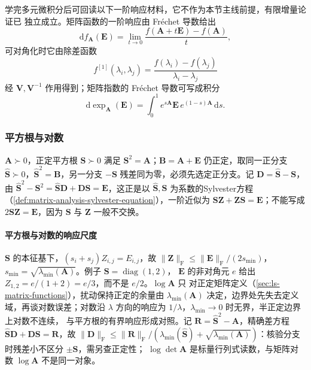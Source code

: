 学完多元微积分后可回读以下一阶响应材料，它不作为本节主线前提，有限增量论证已
独立成立。矩阵函数的一阶响应由 Fréchet 导数给出
\begin{equation}
 \mathrm d f_{\bm A}(\bm E)
 =\lim_{t\to0}\frac{f(\bm A+t\bm E)-f(\bm A)}{t},
 \label{eq:matrix-analysis-frechet-derivative}
\end{equation}
可对角化时它由除差函数
\begin{equation}
 f^{[1]}(\lambda_i,\lambda_j)
 =\frac{f(\lambda_i)-f(\lambda_j)}{\lambda_i-\lambda_j}
 \label{eq:matrix-analysis-frechet-divided-difference}
\end{equation}
经 $\bm V,\bm V^{-1}$ 作用得到；矩阵指数的 Fréchet 导数可写成积分
\begin{equation}
 \mathrm d\exp_{\bm A}(\bm E)
 =\int_0^1 e^{s\bm A}\bm E\,e^{(1-s)\bm A}\,\mathrm ds.
 \label{eq:matrix-analysis-exponential-frechet-derivative}
\end{equation}

\subsubsection{平方根与对数}
\label{sec:ls-square-root-log-sensitivity}

$\bm A\succ0$，正定平方根 $\bm S\succ0$ 满足 $\bm S^2=\bm A$；$\bm B=\bm A+\bm E$
仍正定，取同一正分支 $\widehat{\bm S}\succ0$，$\widehat{\bm S}^2=\bm B$，另一分支
$-\bm S$ 残差同为零，必须先选定正分支。记 $\bm D=\widehat{\bm S}-\bm S$，由
$\widehat{\bm S}^2-\bm S^2=\widehat{\bm S}\bm D+\bm D\bm S=\bm E$，这正是以
$\widehat{\bm S},\bm S$ 为系数的Sylvester方程
（\ref{def:matrix-analysis-sylvester-equation}），一阶近似为
$\bm S\bm Z+\bm Z\bm S=\bm E$；不能写成 $2\bm S\bm Z=\bm E$，因为 $\bm S$ 与
$\bm Z$ 一般不交换。

\paragraph{平方根与对数的响应尺度}

$\bm S$ 的本征基下，$(s_i+s_j)Z_{i,j}=E_{i,j}$，故
$\lVert\bm Z\rVert_{\mathrm F}\leq\lVert\bm E\rVert_{\mathrm F}/(2s_{\min})$，
$s_{\min}=\sqrt{\lambda_{\min}(\bm A)}$。例子 $\bm S=\operatorname{diag}(1,2)$，
$\bm E$ 的非对角元 $e$ 给出 $Z_{1,2}=e/(1+2)=e/3$，而不是 $e/2$。$\log\bm A$ 只
对正定矩阵定义（\ref{sec:ls-matrix-functions}），扰动保持正定的余量由
$\lambda_{\min}(\bm A)$ 决定，边界处先失去定义域，再谈对数误差；对数沿 $\lambda$
方向的响应为 $1/\lambda$，$\lambda_{\min}\to0$ 时无界，半正定边界上对数不连续，
与平方根的有界响应形成对照。记 $\bm R=\widehat{\bm S}^2-\bm A$，精确差方程
$\widehat{\bm S}\bm D+\bm D\bm S=\bm R$，故
$\lVert\bm D\rVert_{\mathrm F}
\leq\lVert\bm R\rVert_{\mathrm F}/(\lambda_{\min}(\widehat{\bm S})
+\sqrt{\lambda_{\min}(\bm A)})$：核验分支时残差小不区分 $\pm\bm S$，需另查正定性；
$\log\det\bm A$ 是标量行列式读数，与矩阵对数 $\log\bm A$ 不是同一对象。

